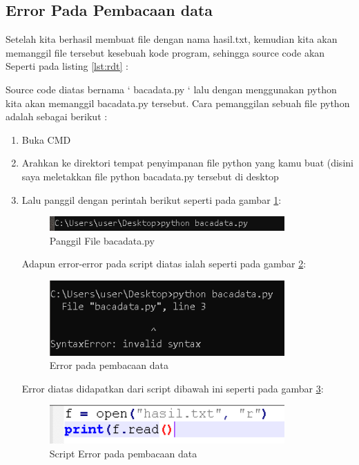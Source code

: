 \subsection{Error Pada Pembacaan data}
Setelah kita berhasil membuat file dengan nama hasil.txt, kemudian kita akan memanggil file tersebut kesebuah kode program, sehingga source code akan Seperti pada listing \ref{lst:rdt} : 


Source code diatas bernama ‘ bacadata.py ‘ lalu dengan menggunakan python kita akan memanggil bacadata.py tersebut. 
Cara pemanggilan sebuah file python adalah sebagai berikut :
\begin{enumerate} 
\item Buka CMD
\item Arahkan ke direktori tempat penyimpanan file python yang kamu buat (disini saya meletakkan file python bacadata.py tersebut di desktop
\item Lalu panggil dengan perintah berikut seperti pada gambar \ref{fig:panggilbcdt}:
\begin{figure}[!htbp]
	\centerline{\includegraphics[width=0.85\textwidth]{figures/6/panggilbcdt.PNG}}
	\caption{Panggil File bacadata.py}
	\label{fig:panggilbcdt}
\end{figure} 
Adapun error-error pada script diatas ialah seperti pada gambar \ref{fig:errdata}:
\begin{figure}[!htbp]
	\centerline{\includegraphics[width=0.85\textwidth]{figures/6/errdata.PNG}}
	\caption{Error pada pembacaan data}
	\label{fig:errdata}
\end{figure} 

Error diatas didapatkan dari script dibawah ini  seperti pada gambar \ref{fig:lsterrdata}:
\begin{figure}[!htbp]
	\centerline{\includegraphics[width=0.85\textwidth]{figures/6/lsterrdata.PNG}}
	\caption{Script Error pada pembacaan data}
	\label{fig:lsterrdata}
\end{figure} 


\end{enumerate}

